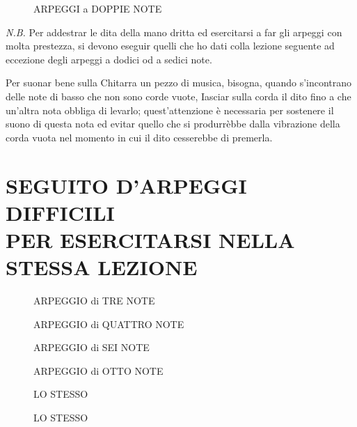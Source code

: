 \documentclass[a4paper]{book}
\begin{document}
\begin{figure}[H]
  \centering
  \begin{minipage}{6in}
    \caption{ARPEGGI a DOPPIE NOTE}
  \end{minipage}
\end{figure}

\textit{N.B\@.}  Per addestrar le dita della mano dritta ed esercitarsi a far gli arpeggi con molta prestezza, si devono eseguir quelli che ho dati colla lezione seguente ad eccezione degli arpeggi a dodici od a sedici note.

Per suonar bene sulla Chitarra un pezzo di musica, bisogna, quando s'incontrano delle note di basso che non sono corde vuote, Iasciar sulla corda il dito fino a che un'altra nota obbliga di levarlo; quest'attenzione è necessaria per sostenere il suono di questa nota ed evitar quello che si produrrèbbe dalla vibrazione della corda vuota nel momento in cui il dito cesserebbe di premerla.

\begin{figure}[h]
  \centering
\end{figure}

\section*{\Large SEGUITO D'ARPEGGI DIFFICILI\\[-1.5ex]
  \small PER ESERCITARSI NELLA STESSA LEZIONE}

\begin{figure}[H]
  \centering
  \begin{minipage}{1.8in}
    \caption{ARPEGGIO di TRE NOTE}
  \end{minipage}
  \hfill
  \begin{minipage}{1.9in}
    \caption{ARPEGGIO di QUATTRO NOTE}
  \end{minipage}
  \hfill
  \begin{minipage}{2.1in}
    \caption{ARPEGGIO di SEI NOTE}
  \end{minipage}
\end{figure}

\begin{figure}[H]
  \centering
  \begin{minipage}{1.8in}
    \caption{ARPEGGIO di OTTO NOTE}
  \end{minipage}
  \hfill
  \begin{minipage}{1.9in}
    \caption{LO STESSO}
  \end{minipage}
  \hfill
  \begin{minipage}{2.1in}
    \caption{LO STESSO}
  \end{minipage}
\end{figure}
\end{document}
